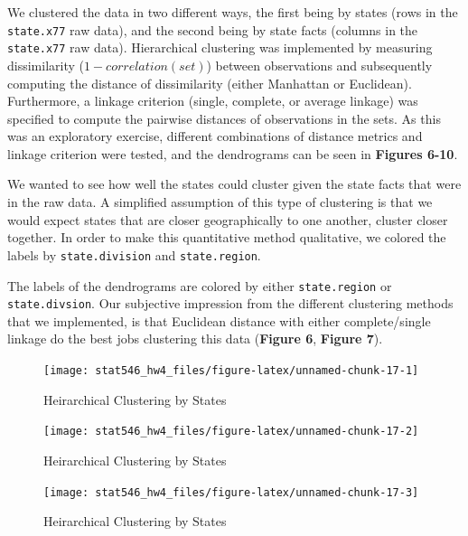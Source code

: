 \documentclass[]{article}
\begin{document}
We clustered the data in two different ways, the first being by states
(rows in the \texttt{state.x77} raw data), and the second being by state
facts (columns in the \texttt{state.x77} raw data). Hierarchical
clustering was implemented by measuring dissimilarity
(\(1 - correlation(set)\)) between observations and subsequently
computing the distance of dissimilarity (either Manhattan or Euclidean).
Furthermore, a linkage criterion (single, complete, or average linkage)
was specified to compute the pairwise distances of observations in the
sets. As this was an exploratory exercise, different combinations of
distance metrics and linkage criterion were tested, and the dendrograms
can be seen in \textbf{Figures 6-10}.

We wanted to see how well the states could cluster given the state facts
that were in the raw data. A simplified assumption of this type of
clustering is that we would expect states that are closer geographically
to one another, cluster closer together. In order to make this
quantitative method qualitative, we colored the labels by
\texttt{state.division} and \texttt{state.region}.

The labels of the dendrograms are colored by either
\texttt{state.region} or \texttt{state.divsion}. Our subjective
impression from the different clustering methods that we implemented, is
that Euclidean distance with either complete/single linkage do the best
jobs clustering this data (\textbf{Figure 6}, \textbf{Figure 7}).

\begin{figure}[h]

{\centering \texttt{[image: stat546\_hw4\_files/figure-latex/unnamed-chunk-17-1]} 

}

\caption{Heirarchical Clustering by States}\label{fig:unnamed-chunk-171}
\end{figure}\begin{figure}[h]

{\centering \texttt{[image: stat546\_hw4\_files/figure-latex/unnamed-chunk-17-2]} 

}

\caption{Heirarchical Clustering by States}\label{fig:unnamed-chunk-172}
\end{figure}\begin{figure}[h]

{\centering \texttt{[image: stat546\_hw4\_files/figure-latex/unnamed-chunk-17-3]} 

}

\caption{Heirarchical Clustering by States}\label{fig:unnamed-chunk-173}
\end{figure}
\end{document}
